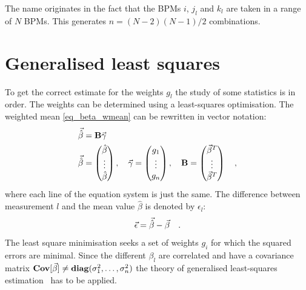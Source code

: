 The name originates in the fact that the BPMs $i$, $j_l$ and $k_l$ are taken in a range of $N$ BPMs.
This generates $n = (N-2)(N-1)/2$ combinations.

\section{Generalised least squares}

To get the correct estimate for the weights $g_l$ the study of some statistics is in order.
The weights can be determined using a least-squares optimisation. The weighted mean \eqref{eq_beta_wmean}
can be rewritten in vector notation:
%
\begin{align}
    \vec{\hat{\beta}} &= \mathbf{B}\vec{\gamma}
    \label{eq_beta_wmean_vec}\\
    \vec{\hat{\beta}} &= 
    \begin{pmatrix}
        \hat{\beta}\\
        \vdots\\
        \hat{\beta}
    \end{pmatrix},\quad
    \vec{\gamma} =
    \begin{pmatrix}
        g_1\\
        \vdots\\
        g_n
    \end{pmatrix},\quad
    \mathbf{B} =
    \begin{pmatrix}
        \vec{\beta}^T\\
        \vdots\\
        \vec{\beta}^T
    \end{pmatrix}
    \quad ,
\end{align}
%
where each line of the equation system is just the same.
The difference between measurement $l$ and the mean value $\hat{\beta}$ is denoted by $\epsilon_l$:
%
\begin{equation}
    \vec{\epsilon} = \vec{\hat{\beta}} - \vec{\beta}
    \quad .
\end{equation}
%
The least square minimisation seeks a set of weights $g_i$ for which the squared errors are minimal. Since the different $\beta_l$
are correlated and have a covariance matrix $\mathbf{Cov}[\vec{\beta}] \neq \mathbf{diag}(\sigma_1^2, \ldots, \sigma_n^2)$
the theory of generalised least-squares estimation~\cite{kariya2004generalized} has to be applied.

